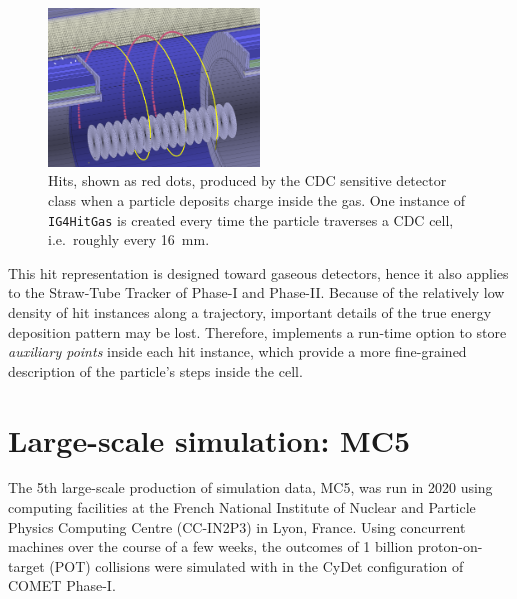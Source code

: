 \begin{figure}
    \centering
    \includegraphics[width=0.5\textwidth]{chapter3/hit_instances_blur_crop.png}
    \caption{
        Hits, shown as red dots, produced by the CDC sensitive detector class
        when a particle deposits charge inside the gas. One instance of
        \texttt{IG4HitGas} is created every time the particle traverses a CDC
        cell, i.e.\ roughly every \SI{16}{\mm}.
        }
    \label{fig:sim_cdc_hits}
\end{figure}


This hit representation is designed toward gaseous detectors, hence it
also applies to the Straw-Tube Tracker of Phase\nobreakdash-I and Phase\nobreakdash-II. Because of the
relatively low density of hit instances along a trajectory, important details of
the true energy deposition pattern may be lost. Therefore, \SimG implements a
run-time option to store \emph{auxiliary points} inside each hit instance, which
provide a more fine-grained description of the particle's steps inside the cell.




\section{Large-scale simulation: MC5}
\label{sec:mc5}
The 5th large-scale production of simulation data, MC5, was run in 2020 using
computing facilities at the French National Institute of Nuclear and Particle
Physics Computing Centre (CC-IN2P3) in Lyon, France. Using 
concurrent machines over the course of a few weeks, the outcomes of 1 billion
proton-on-target (POT) collisions were simulated with \SimG in the CyDet
configuration of COMET Phase\nobreakdash-I.

